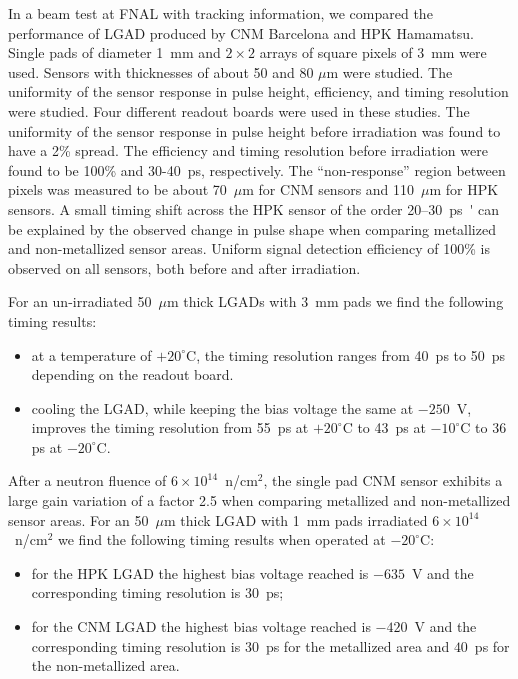 \documentclass[preprint,1p]{elsarticle}
\begin{document}
In a beam test at FNAL with tracking information, we compared the performance of
LGAD produced by CNM Barcelona and HPK Hamamatsu. Single pads of diameter 1~mm
and $2\times 2$ arrays of square pixels of 3~mm were used. Sensors with
thicknesses of about 50 and 80 $\mu$m were studied. The uniformity of the
sensor response in pulse height, efficiency, and timing resolution
were studied. Four different readout boards 
were used in these studies. The uniformity of the
sensor response in pulse height before irradiation was found to have a
2\% spread. The efficiency and timing  resolution before irradiation
were found to be 100\%  and 30-40~\si{ps}, respectively. The
``non-response'' region between pixels was measured to be about 70~$\mu$m for CNM sensors and 110~$\mu$m for HPK sensors. 
A small timing shift across the HPK sensor of the order 20--30~\si{ps'} can
be explained by the observed change in pulse shape when comparing metallized and
non-metallized sensor areas. Uniform signal detection efficiency of 100\% is
observed on all sensors, both before and after irradiation. 

For an un-irradiated 50~$\mu$m thick LGADs with 3~mm pads we find the following timing results: 
\begin{itemize}
  \item at a temperature of $+20^{\circ}$C, the timing resolution ranges from
        40~ps to 50~ps depending on the readout board. %
  \item cooling the LGAD, while keeping the bias voltage the same at $-250$~V,
        improves the timing resolution from 55~ps at $+20^{\circ}$C to 43~ps at
        $-10^{\circ}$C to 36 ps at $-20^{\circ}$C. \end{itemize}

After a neutron fluence of $6\times 10^{14}$~n/cm$^2$, the single pad CNM sensor
exhibits a large gain variation of a factor 2.5 when comparing metallized and
non-metallized sensor areas. For an 50~$\mu$m thick LGAD with 1~mm pads
irradiated $6\times 10^{14}$~n/cm$^2$ we find the following timing results when
operated at $-20^{\circ}$C: 

\begin{itemize}
  \item for the HPK LGAD the highest bias voltage reached is $-635$~V
    and the corresponding timing resolution is 30~ps; 
  \item for the CNM LGAD the highest bias voltage reached is $-420$~V
    and the corresponding
        timing resolution is 30~ps for the metallized area and $40$~ps for the
        non-metallized area.
\end{itemize}
\end{document}
